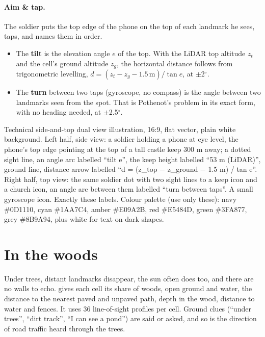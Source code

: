 \paragraph{Aim \& tap.} The soldier puts the top edge of the phone on the top of each landmark he sees,
taps, and names them in order.
\begin{itemize}
  \item The \textbf{tilt} is the elevation angle $e$ of the top. With the LiDAR top altitude $z_t$ and the
        cell's ground altitude $z_g$, the horizontal distance follows from trigonometric levelling,
        $d = (z_t - z_g - 1.5\,\text{m}) / \tan e$, at $\pm$2$^\circ$.
  \item The \textbf{turn} between two taps (gyroscope, no compass) is the angle between two landmarks seen from
        the spot. That is Pothenot's problem in its exact form, with no heading needed, at $\pm$2.5$^\circ$.
\end{itemize}

{Technical side-and-top dual view illustration, 16:9, flat vector, plain white background. Left half, side view: a
soldier holding a phone at eye level, the phone's top edge pointing at the top of a tall castle keep 300 m away;
a dotted sight line, an angle arc labelled ``tilt e'', the keep height labelled ``53 m (LiDAR)'', ground line,
distance arrow labelled ``d = (z\_top − z\_ground − 1.5 m) / tan e''. Right half, top view: the same soldier dot with
two sight lines to a keep icon and a church icon, an angle arc between them labelled ``turn between taps''. A
small gyroscope icon. Exactly these labels. Colour palette (use only these): navy \#0D1110, cyan \#1AA7C4, amber \#E09A2B, red \#E5484D, green \#3FA877, grey \#8B9A94, plus white for text on dark shapes.}

\section{In the woods}

Under trees, distant landmarks disappear, the sun often does too, and there are no walls to echo.
 gives each cell its share of woods, open ground and water, the distance to the nearest
paved and unpaved path, depth in the wood, distance to water and fences. It uses 36 line-of-sight profiles
per cell. Ground clues (``under trees'', ``dirt track'', ``I can see a pond'') are said or asked, and so is the
direction of road traffic heard through the trees.

